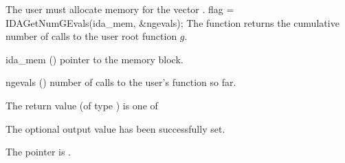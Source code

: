 {{  {\warn}The user must allocate memory for the vector .
}
{
  flag = IDAGetNumGEvals(ida\_mem, \&ngevals);
}
{
  The function  returns the cumulative
  number of calls to the user root function $g$.
}
{
  \begin{args}
  \item[ida\_mem] ()
    pointer to the {\ida} memory block.
  \item[ngevals] ()
    number of calls to the user's function  so far.
  \end{args}
}
{
  The return value  (of type ) is one of
  \begin{args}
  \item[\Id{IDA\_SUCCESS}] 
    The optional output value has been successfully set.
  \item[\Id{IDA\_MEM\_NULL}]
    The  pointer is .
  \end{args}
}
{}


}

